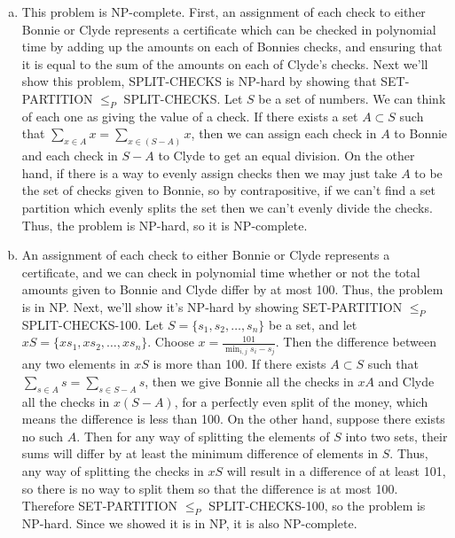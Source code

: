 \documentclass{article}
\begin{document}
\begin{enumerate}[a.]
\item This problem is NP-complete.  First, an assignment of each check to either Bonnie or Clyde represents a certificate which can be checked in polynomial time by adding up the amounts on each of Bonnies checks, and ensuring that it is equal to the sum of the amounts on each of Clyde's checks.  Next we'll show this problem, SPLIT-CHECKS is NP-hard by showing that SET-PARTITION $\leq_P$ SPLIT-CHECKS.  Let $S$ be a set of numbers. We can think of each one as giving the value of a check.  If there exists a set $A \subset S$ such that $\sum_{x \in A} x = \sum_{x \in (S-A)} x$, then we can assign each check in $A$ to Bonnie and each check in $S-A$ to Clyde to get an equal division.  On the other hand, if there is a way to evenly assign checks then we may just take $A$ to be the set of checks given to Bonnie, so by contrapositive, if we can't find a set partition which evenly splits the set then we can't evenly divide the checks.  Thus, the problem is NP-hard, so it is NP-complete. 

\item An assignment of each check to either Bonnie or Clyde represents a certificate, and we can check in polynomial time whether or not the total amounts given to Bonnie and Clyde differ by at most 100.  Thus, the problem is in NP.  Next, we'll show it's NP-hard by showing SET-PARTITION $\leq_P$ SPLIT-CHECKS-100.  Let $S = \{s_1, s_2, \ldots, s_n\}$ be a set, and let $xS = \{xs_1, xs_2, \ldots, xs_n\}$.  Choose $x = \frac{101}{\min_{i,j} s_i-s_j}$.  Then the difference between any two elements in $xS$ is more than 100. If there exists $A \subset S$ such that $\sum_{s \in A} s = \sum_{s \in S-A} s$, then we give Bonnie all the checks in $xA$ and Clyde all the checks in $x(S-A)$, for a perfectly even split of the money, which means the difference is less than 100.  On the other hand, suppose there exists no such $A$.  Then for any way of splitting the elements of $S$ into two sets, their sums will differ by at least the minimum difference of elements in $S$.  Thus, any way of splitting the checks in $xS$ will result in a difference of at least 101, so there is no way to split them so that the difference is at most 100.  Therefore SET-PARTITION $\leq_P$ SPLIT-CHECKS-100, so the problem is NP-hard.  Since we showed it is in NP, it is also NP-complete. 
\end{enumerate}
\end{document}
